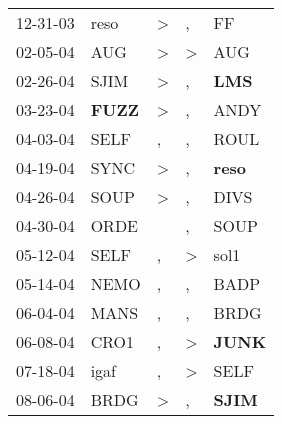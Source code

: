 \begin{supertabular}{p{0.07\textwidth}p{0.06\textwidth}p{0.02\textwidth}p{0.02\textwidth}p{0.06\textwidth}}
          12-31-03\textsuperscript{} &           reso\textsuperscript{} &     \textgreater &                , &             FF\textsuperscript{} \\
          02-05-04\textsuperscript{} &            AUG\textsuperscript{} &     \textgreater &     \textgreater &            AUG\textsuperscript{} \\
          02-26-04\textsuperscript{} &           SJIM\textsuperscript{} &     \textgreater &                , &   \textbf{LMS\textsuperscript{}} \\
          03-23-04\textsuperscript{} &  \textbf{FUZZ\textsuperscript{}} &     \textgreater &                , &           ANDY\textsuperscript{} \\
          04-03-04\textsuperscript{} &           SELF\textsuperscript{} &                , &                , &           ROUL\textsuperscript{} \\
          04-19-04\textsuperscript{} &           SYNC\textsuperscript{} &     \textgreater &                , &  \textbf{reso\textsuperscript{}} \\
          04-26-04\textsuperscript{} &           SOUP\textsuperscript{} &     \textgreater &                , &           DIVS\textsuperscript{} \\
          04-30-04\textsuperscript{} &           ORDE\textsuperscript{} &                  &                , &           SOUP\textsuperscript{} \\
          05-12-04\textsuperscript{} &           SELF\textsuperscript{} &                , &     \textgreater &           sol1\textsuperscript{} \\
          05-14-04\textsuperscript{} &           NEMO\textsuperscript{} &                , &                , &           BADP\textsuperscript{} \\
          06-04-04\textsuperscript{} &           MANS\textsuperscript{} &                , &                , &           BRDG\textsuperscript{} \\
          06-08-04\textsuperscript{} &           CRO1\textsuperscript{} &                , &     \textgreater &  \textbf{JUNK\textsuperscript{}} \\
          07-18-04\textsuperscript{} &           igaf\textsuperscript{} &                , &     \textgreater &           SELF\textsuperscript{} \\
          08-06-04\textsuperscript{} &           BRDG\textsuperscript{} &     \textgreater &                , &  \textbf{SJIM\textsuperscript{}} \\

\end{supertabular}
